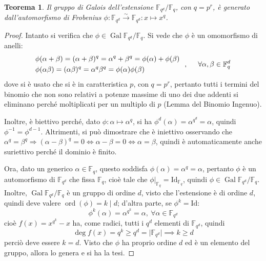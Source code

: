 \documentclass[12pt]{scrartcl}
\theoremstyle{style}
\newtheorem{teorema}{Teorema}[section]
\numberwithin{equation}{subsection}
\begin{document}
\begin{teorema}
	Il gruppo di Galois dell'estensione $\mathbb{F}_{q^d} /\mathbb{F}_q$, con $q = p^r$, \`e generato dall'automorfismo di Frobenius $\phi :\mathbb{F}_{q^d} \stackrel{\sim}{\longrightarrow} \mathbb{F}_{q^d} : x \longmapsto x^q$.
\end{teorema}
\begin{proof}
	Intanto si verifica che $\phi  \in \operatorname{Gal} \mathbb{F}_{q^d} /\mathbb{F}_q$. 
	Si vede che $\phi $ \`e un omomorfismo di anelli:
	\[
	\begin{split}
		&\phi (\alpha +\beta ) = (\alpha +\beta )^q = \alpha ^q + \beta ^q = \phi (\alpha ) + \phi (\beta ) \\
		&\phi (\alpha \beta )= (\alpha \beta )^q = \alpha ^q \beta ^q = \phi (\alpha )\phi (\beta ) 
	\end{split}\hspace{.25cm}, \hspace{.5cm}\forall \alpha ,\beta  \in \mathbb{F}_q^d
	\] 
	dove si \`e usato che si \`e in caratteristica $p$, con $q= p^r$, pertanto tutti i termini del binomio che non sono relativi a potenze massime di uno dei due addenti si eliminano perch\'e moltiplicati per un multiplo di $p$ (Lemma del Binomio Ingenuo).

	Inoltre, \`e biettivo perch\'e, dato $\phi :\alpha \longmapsto \alpha ^q$, si ha $\phi ^d (\alpha ) = \alpha ^{q^d}= \alpha$, quindi $\phi ^{-1}=\phi ^{d-1} $.
	Altrimenti, si pu\`o dimostrare che \`e iniettivo osservando che $\alpha ^q = \beta ^q\Rightarrow (\alpha -\beta )^q = 0 \iff \alpha - \beta = 0 \iff \alpha = \beta $, quindi \`e automaticamente anche suriettivo perch\'e il dominio \`e finito.

Ora, dato un generico $\alpha \in \mathbb{F}_q$, questo soddisfa $\phi (\alpha )= \alpha ^q = \alpha $, pertanto $\phi $ \`e un automorfismo di $\mathbb{F}_{q^d} $ che fissa $\mathbb{F}_q$, cio\`e tale che $\phi |_{\mathbb{F}_q}= \mathrm{Id} _{\mathbb{F}_q} $, quindi $\phi \in \operatorname{Gal} \mathbb{F}_{q^d} /\mathbb{F}_q$.
Inoltre, $\operatorname{Gal} \mathbb{F}_{q^d} / \mathbb{F}_q$ \`e un gruppo di ordine $d$, visto che l'estensione \`e di ordine $d$, quindi deve valere $\operatorname{ord}(\phi ) = k  \mid d$; d'altra parte, se $\phi ^k = \mathrm{Id} $:
\[
\phi ^k(\alpha ) = \alpha ^{q^k} = \alpha , \ \forall \alpha \in \mathbb{F}_{q^d} 
\] 
cio\`e $f(x) = x^{q^k} -x$ ha, come radici, tutti i $q^d$ elementi di $\mathbb{F}_{q^d} $, quindi 
\[
\deg f(x) = q^k \ge q^d = \lvert \mathbb{F}_{q^d}  \rvert \implies k\ge d
\] 
perci\`o deve essere $ k =d$.
Visto che $\phi $ ha proprio ordine $d$ ed \`e un elemento del gruppo, allora lo genera e si ha la tesi.
\end{proof}
\end{document}

